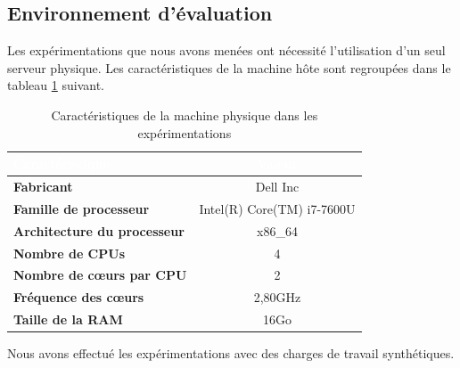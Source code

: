 \subsection{Environnement d'évaluation}
Les expérimentations que nous avons menées ont nécessité l'utilisation d'un seul serveur physique. Les caractéristiques de la machine hôte sont regroupées dans le tableau \ref{tab:caracteristiques_machines} suivant.
\begin{table}[H]
  \begin{center}
    \caption{Caractéristiques de la machine physique dans les expérimentations}
    \begin{tabular}{|>{\bfseries}l|c|}
      \hline
      \cellcolor[RGB]{165,42,42}\textcolor{white}{\textbf{Caractéristique}} & \cellcolor[RGB]{165,42,42}\textcolor{white}{\textbf{Valeur}}\\
      \hline
      \hline
      Fabricant & Dell Inc \\ \hline
      Famille de processeur & Intel(R) Core(TM) i7-7600U \\ \hline
      Architecture du processeur & x86\_64 \\ \hline
      Nombre de CPUs & 4 \\ \hline
      Nombre de cœurs par CPU & 2 \\ \hline
      Fréquence des cœurs & 2,80GHz \\ \hline
      Taille de la RAM & 16Go \\ \hline
    \end{tabular}
    \label{tab:caracteristiques_machines}
  \end{center}
\end{table}

\noindent Nous avons effectué les expérimentations avec des charges de travail synthétiques. 

